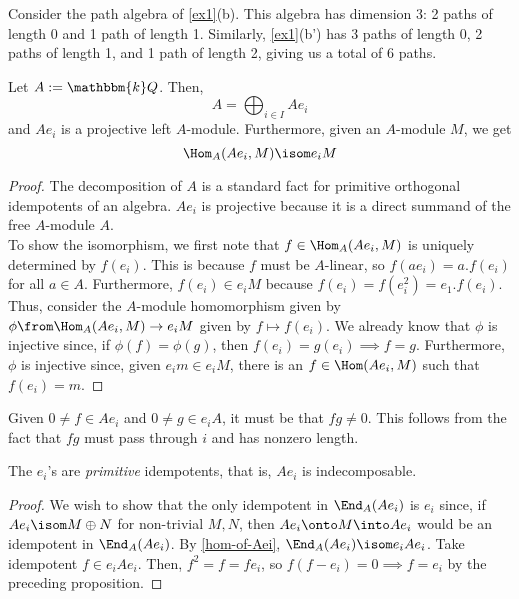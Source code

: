 \documentclass[11pt,leqno,oneside]{amsbook}
\numberwithin{thm}{section}
\newcommand{\bbk}{\mathbbm{k}} %
\begin{document}
\begin{example}
  Consider the path algebra of \ref{ex1}(b). This algebra has
  dimension 3: 2 paths of length 0 and 1 path of length 1. Similarly,
  \ref{ex1}(b') has 3 paths of length 0, 2 paths of length 1, and 1
  path of length 2, giving us a total of 6 paths.
\end{example}
\begin{prop}\label{hom-of-Aei}
  Let \(A := \bbk Q\). Then, \[
    A = \bigoplus_{i \in I} A e_i
  \]
  and \(A e_i\) is a projective left \(A\)-module. Furthermore, given
  an \(A\)-module \(M\), we get \[
    \Hom_A(A e_i, M) \isom e_i M
  \]
\end{prop}
\begin{proof}
  The decomposition of \(A\) is a standard fact for primitive
  orthogonal idempotents of an algebra. \(A e_i\) is projective
  because it is a direct summand of the free \(A\)-module \(A\). \\

  To show the isomorphism, we first note that \(f \in \Hom_A(A e_i,
  M)\) is uniquely determined by \(f(e_i)\). This is because \(f\)
  must be \(A\)-linear, so \(f(a e_i) = a.f(e_i)\) for all \(a \in
  A\). Furthermore, \(f(e_i) \in e_i M\) because \(f(e_i) = f(e_i^2) =
  e_1.f(e_i)\). Thus, consider the \(A\)-module homomorphism given by
  \(\phi \from \Hom_A(A e_i, M) \to e_i M\) given by \(f \mapsto
  f(e_i)\). We already know that \(\phi\) is injective since, if
  \(\phi(f) = \phi(g)\), then \(f(e_i) = g(e_i) \implies f =
  g\). Furthermore, \(\phi\) is injective since, given \(e_i m \in e_i
  M\), there is an \(f \in \Hom(A e_i, M)\) such that \(f(e_i) = m\). 
\end{proof}
\begin{prop}
  Given \(0 \neq f \in A e_i\) and \(0 \neq g \in e_i A\), it must be
  that \(fg \neq 0\). This follows from the fact that \(fg\) must pass
  through \(i\) and has nonzero length. 
\end{prop}
\begin{prop}
  The \(e_i\)'s are \emph{primitive} idempotents, that is, \(A e_i\)
  is indecomposable.
\end{prop}
\begin{proof}
  We wish to show that the only idempotent in \(\End_A(A e_i)\) is
  \(e_i\) since, if \(Ae_i \isom M \oplus N\) for non-trivial \(M,N\), then \(A e_i \onto M
  \into A e_i \) would be an idempotent in \(\End_A(A e_i)\). By
  \ref{hom-of-Aei}, \(\End_A(A e_i) \isom e_i A e_i\). Take idempotent
  \(f \in e_i A e_i\). Then, \(f^2 = f = f e_i\), so \(f(f-e_i) = 0
  \implies f = e_i\) by the preceding proposition.
\end{proof}
\end{document}
